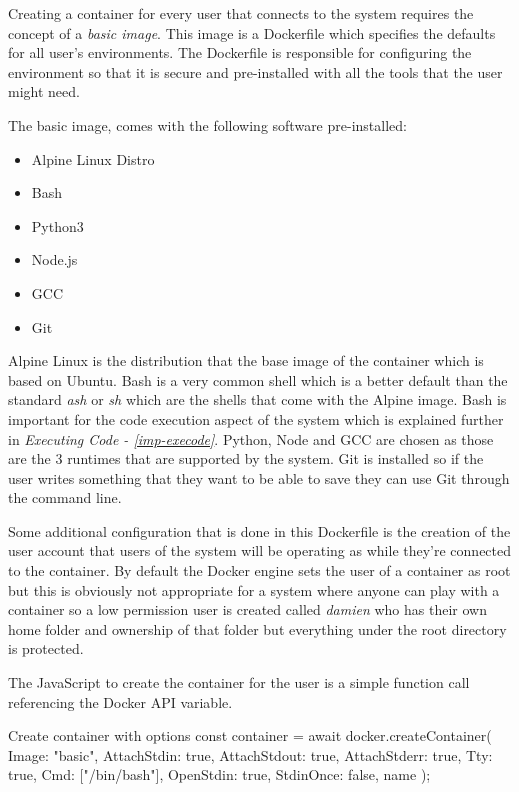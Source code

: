 Creating a container for every user that connects to the system requires the concept of a \textit{basic image}. This image is a Dockerfile which specifies the defaults for all user's environments. The Dockerfile is responsible for configuring the environment so that it is secure and pre-installed with all the tools that the user might need.

The basic image, comes with the following software pre-installed: 

\begin{itemize}
    \item Alpine Linux Distro
    \item Bash
    \item Python3
    \item Node.js
    \item GCC
    \item Git
\end{itemize}

Alpine Linux is the distribution that the base image of the container which is based on Ubuntu. Bash is a very common shell which is a better default than the standard \textit{ash} or \textit{sh} which are the shells that come with the Alpine image. Bash is important for the code execution aspect of the system which is explained further in \textit{Executing Code - \ref{imp-execode}}. Python, Node and GCC are chosen as those are the 3 runtimes that are supported by the system. Git is installed so if the user writes something that they want to be able to save they can use Git through the command line.

Some additional configuration that is done in this Dockerfile is the creation of the user account that users of the system will be operating as while they're connected to the container. By default the Docker engine sets the user of a container as root but this is obviously not appropriate for a system where anyone can play with a container so a low permission user is created called \textit{damien} who has their own home folder and ownership of that folder but everything under the root directory is protected.

The JavaScript to create the container for the user is a simple function call referencing the Docker API variable.

\begin{sexylisting}{Create container with options}
const container = await docker.createContainer({
    Image: "basic",
    AttachStdin: true,
    AttachStdout: true,
    AttachStderr: true,
    Tty: true,
    Cmd: ["/bin/bash"],
    OpenStdin: true,
    StdinOnce: false,
    name
});
\end{sexylisting}

